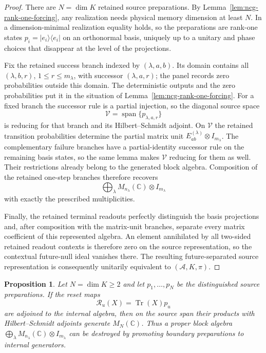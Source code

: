 \documentclass[11pt]{article}
\newtheorem{proposition}[proposition]{Proposition}
\theoremstyle{definition}
\theoremstyle{remark}
\theoremstyle{definition}
\theoremstyle{remark}
\newcommand{\C}{\mathbb C}
\newcommand{\Tr}{\operatorname{Tr}}
\newcommand{\Span}{\operatorname{span}}
\newcommand{\A}{\mathcal A}
\begin{document}
\begin{proof}
There are $N=\dim K$ retained source preparations.  By
Lemma~\ref{lem:ncg-rank-one-forcing}, any realization needs physical memory
dimension at least $N$.  In a dimension-minimal realization equality holds, so the
preparations are rank-one states
$p_i=|e_i\rangle\langle e_i|$ on an orthonormal basis, uniquely up to a unitary and
phase choices that disappear at the level of the projections.

Fix the retained success branch indexed by $(\lambda,a,b)$.  Its domain
contains all $(\lambda,b,r)$, $1\le r\le m_\lambda$, with successor
$(\lambda,a,r)$; the panel records zero probabilities outside this domain.
The deterministic outputs and the zero probabilities put it in the situation of
Lemma~\ref{lem:ncg-rank-one-forcing}.  For a fixed branch the successor rule is a
partial injection, so the diagonal source space
\[
 \mathcal V=\Span\{p_{\lambda,a,r}\}
\]
is reducing for that branch and its Hilbert--Schmidt adjoint.  On $\mathcal V$ the
retained transition probabilities determine the partial matrix unit
$E_{ab}^{(\lambda)}\otimes I_{m_\lambda}$.  The complementary failure branches
have a partial-identity successor rule on the remaining basis states, so the same
lemma makes $\mathcal V$ reducing for them as well.  Their restrictions already
belong to the generated block algebra.  Composition of the retained one-step
branches therefore recovers
\[
 \bigoplus_\lambda M_{n_\lambda}(\mathbb C)\otimes I_{m_\lambda}
\]
with exactly the prescribed multiplicities.

Finally, the retained terminal readouts perfectly distinguish the basis projections
and, after composition with the matrix-unit branches, separate every matrix
coefficient of this represented algebra.  An element annihilated by all two-sided
retained readout contexts is therefore zero on the source representation, so the
contextual future-null ideal vanishes there.  The resulting future-separated source
representation is consequently unitarily equivalent to $(\A,K,\pi)$.
\end{proof}

\begin{proposition}
\label{prop:ncg-boundary-enlargement}
Let $N=\dim K\ge2$ and let $p_1,\ldots,p_N$ be the distinguished source
preparations.  If the reset maps
\[
 \mathcal R_u(X)=\Tr(X)p_u
\]
are adjoined to the internal algebra, then on the source span their products with
Hilbert--Schmidt adjoints generate $M_N(\C)$.  Thus a proper block algebra
$\bigoplus_\lambda M_{n_\lambda}(\C)\otimes I_{m_\lambda}$ can be destroyed by
promoting boundary preparations to internal generators.
\end{proposition}
\end{document}
